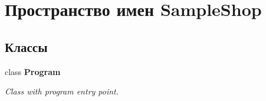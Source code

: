 \hypertarget{namespace_sample_shop}{}\section{Пространство имен Sample\+Shop}
\label{namespace_sample_shop}
\subsection*{Классы}
\begin{DoxyCompactItemize}
\item 
class {\bfseries Program}
\begin{DoxyCompactList}\small\item\em Class with program entry point. \end{DoxyCompactList}\end{DoxyCompactItemize}
